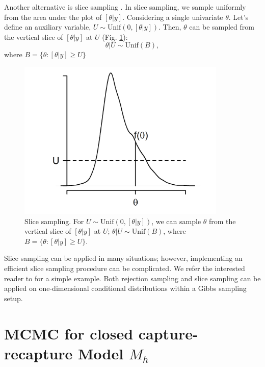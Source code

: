 Another alternative is slice sampling
\citep{neal:2003}. In slice sampling, we sample uniformly from the
area under the plot of $[\theta|y]$. Considering a single univariate
$\theta$. Let's define an auxiliary variable, $U \sim \mbox{Unif}(0,
[\theta|y])$. Then, $\theta$ can be sampled from the vertical slice
of $[\theta|y]$ at $U$ (Fig. \ref{mcmc.fig.slicesample}):
\[
\theta|U \sim \mbox{Unif}(B),
\]
where $B = \{\theta: [\theta|y] \geq U\}$

\begin{figure}[ht]
\begin{center}
\includegraphics[height=3in]{Ch17-MCMC/figs/slicesampling}
\end{center}
\caption{
Slice sampling. For
$U \sim \mbox{Unif}(0, [\theta|y])$,
we can sample $\theta$ from the vertical slice of $[\theta|y]$ at $U$;
$\theta|U \sim \mbox{Unif}(B)$,
where $B = \{ \theta: [\theta|y] \geq U\}$.
}
\label{mcmc.fig.slicesample}
\end{figure}


Slice sampling can be applied in many situations; however,
implementing an efficient slice sampling procedure can be
complicated. We refer the interested reader to
\citet[][Chapt. 7]{robert_casella:2010} for a simple example.  Both rejection
sampling and slice sampling can be applied on one-dimensional
conditional distributions within a Gibbs sampling setup.

\section{MCMC for closed capture-recapture Model $M_h$}

